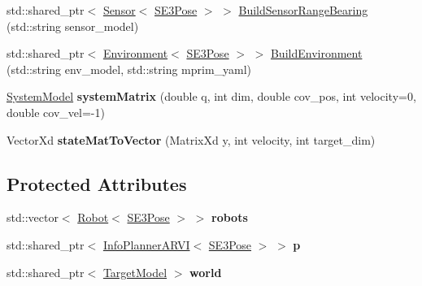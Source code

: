 \begin{DoxyCompactItemize}
std\+::shared\+\_\+ptr$<$ \hyperlink{classnx_1_1Sensor}{Sensor}$<$ \hyperlink{structnx_1_1SE3Pose}{S\+E3\+Pose} $>$ $>$ \hyperlink{classnx_1_1Parameters_a7db487d62b8cbcc1ecda0ef1a8356d6a}{Build\+Sensor\+Range\+Bearing} (std\+::string sensor\+\_\+model)
\item 
std\+::shared\+\_\+ptr$<$ \hyperlink{classnx_1_1Environment}{Environment}$<$ \hyperlink{structnx_1_1SE3Pose}{S\+E3\+Pose} $>$ $>$ \hyperlink{classnx_1_1Parameters_a0c4e7b6182700d0b197487fff137a7db}{Build\+Environment} (std\+::string env\+\_\+model, std\+::string mprim\+\_\+yaml)
\item 
\mbox{\label{classnx_1_1Parameters_aa1416a85c9227ce6ecdcbad5e9f5f908}} 
\hyperlink{structnx_1_1Parameters_1_1SystemModel}{System\+Model} {\bfseries system\+Matrix} (double q, int dim, double cov\+\_\+pos, int velocity=0, double cov\+\_\+vel=-\/1)
\item 
\mbox{\label{classnx_1_1Parameters_a632252c9a761a1ad72e3a18cf9a37b29}} 
Vector\+Xd {\bfseries state\+Mat\+To\+Vector} (Matrix\+Xd y, int velocity, int target\+\_\+dim)
\end{DoxyCompactItemize}
\subsection*{Protected Attributes}
\begin{DoxyCompactItemize}
\item 
\mbox{\label{classnx_1_1Parameters_ac0dc505251048e4c0167a22f7d45bebb}} 
std\+::vector$<$ \hyperlink{classnx_1_1Robot}{Robot}$<$ \hyperlink{structnx_1_1SE3Pose}{S\+E3\+Pose} $>$ $>$ {\bfseries robots}
\item 
\mbox{\label{classnx_1_1Parameters_a9a4ef825832048d0a7c28ef8cba4cc9c}} 
std\+::shared\+\_\+ptr$<$ \hyperlink{classnx_1_1InfoPlannerARVI}{Info\+Planner\+A\+R\+VI}$<$ \hyperlink{structnx_1_1SE3Pose}{S\+E3\+Pose} $>$ $>$ {\bfseries p}
\item 
\mbox{\label{classnx_1_1Parameters_acc849bc406ec19f4eab96fe8a4320ba1}} 
std\+::shared\+\_\+ptr$<$ \hyperlink{classnx_1_1TargetModel}{Target\+Model} $>$ {\bfseries world}
\end{DoxyCompactItemize}



